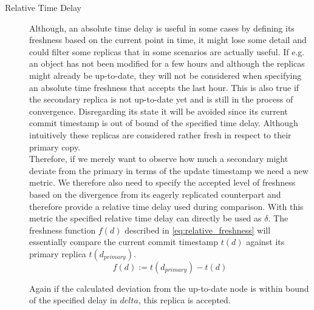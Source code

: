 \begin{description}
    \item [Relative Time Delay] 
    Although, an absolute time delay is useful in some cases by defining its freshness based on the current point in time, 
    it might lose some detail and could filter some replicas that in some scenarios are actually useful.
    If e.g. an object has not been modified for a few hours and although the replicas might already be up-to-date, they will not be considered when specifying 
    an absolute time freshness that accepts the last hour.
    This is also true if the secondary replica is not up-to-date yet and is still in the process of convergence.
    Disregarding its state it will be avoided since its current commit timestamp is out of bound of the specified time delay.
    Although intuitively these replicas are considered rather fresh in respect to their primary copy.\\
    Therefore, if we merely want to observe how much a secondary might deviate from the primary in terms of the update timestamp we need a new metric.
    We therefore also need to specify the accepted level of freshness based on the divergence from its eagerly replicated counterpart and therefore provide a relative time delay
    used during comparison.
    With this metric the specified relative time delay can directly be used as $\delta$. The freshness function $f(d)$ described in \ref{eq:relative_freshness}
    will essentially compare the current commit timestamp $t(d)$ against its primary replica $t(d_{primary})$.
        \begin{equation} \label{eq:relative_freshness}
            f(d) := t(d_{primary}) - t(d)
        \end{equation}

    Again if the calculated deviation from the up-to-date node is within bound of the specified delay in $delta$, this replica is accepted.




\end{description}
